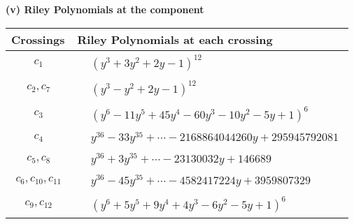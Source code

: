 \documentclass[1p]{elsarticle_modified}
\theoremstyle{definition}
\begin{document}
\flushleft \textbf{(v) Riley Polynomials at the component}\newline \\
\begin{tabular}{m{50pt}|m{274pt}}
Crossings & \hspace{64pt}Riley Polynomials at each crossing \\
\hline $$\begin{aligned}c_{1}\end{aligned}$$&$\begin{aligned}
&(y^3+3 y^2+2 y-1)^{12}
\end{aligned}$\\
\hline $$\begin{aligned}c_{2},c_{7}\end{aligned}$$&$\begin{aligned}
&(y^3- y^2+2 y-1)^{12}
\end{aligned}$\\
\hline $$\begin{aligned}c_{3}\end{aligned}$$&$\begin{aligned}
&(y^6-11 y^5+45 y^4-60 y^3-10 y^2-5 y+1)^6
\end{aligned}$\\
\hline $$\begin{aligned}c_{4}\end{aligned}$$&$\begin{aligned}
&y^{36}-33 y^{35}+\cdots-2168864044260 y+295945792081
\end{aligned}$\\
\hline $$\begin{aligned}c_{5},c_{8}\end{aligned}$$&$\begin{aligned}
&y^{36}+3 y^{35}+\cdots-23130032 y+146689
\end{aligned}$\\
\hline $$\begin{aligned}c_{6},c_{10},c_{11}\end{aligned}$$&$\begin{aligned}
&y^{36}-45 y^{35}+\cdots-4582417224 y+3959807329
\end{aligned}$\\
\hline $$\begin{aligned}c_{9},c_{12}\end{aligned}$$&$\begin{aligned}
&(y^6+5 y^5+9 y^4+4 y^3-6 y^2-5 y+1)^6
\end{aligned}$\\
\hline
\end{tabular}\\~\\
\end{document}
